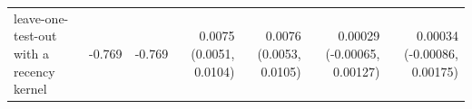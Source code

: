\begin{tabular}{lrrrrrr}
leave-one-test-out with a recency kernel & -0.769 & -0.769 & 0.0075 (0.0051, 0.0104) & 0.0076 (0.0053, 0.0105) & 0.00029 (-0.00065, 0.00127) & 0.00034 (-0.00086, 0.00175) \\

\end{tabular}
